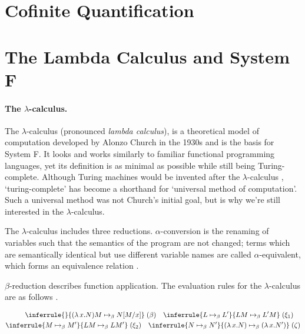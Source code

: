 \documentclass[logo,bsc,singlespacing,parskip,online]{infthesis}
\begin{document}
\section{Cofinite Quantification}



\section{The Lambda Calculus and System F}

\paragraph*{The $\lambda$-calculus.}
The $\lambda$-calculus (pronounced \textit{lambda calculus}), is a theoretical model of computation
developed by Alonzo Church in the 1930s \citep{church_set_1932} and is the basis for System F. It
looks and works similarly to familiar functional programming languages, yet its definition is as
minimal as possible while still being Turing-complete. Although Turing machines would be invented
after the $\lambda$-calculus \citep{turing_computable_1937}, `turing-complete' has become a
shorthand for `universal method of computation'. Such a universal method was not Church's initial
goal, but is why we're still interested in the $\lambda$-calculus.

The $\lambda$-calculus includes three reductions. $\alpha$-conversion is the renaming of variables
such that the semantics of the program are not changed; terms which are semantically identical but
use different variable names are called $\alpha$-equivalent, which forms an equivalence relation
\citep{pierce_types_2002}.

$\beta$-reduction describes function application. The evaluation rules for the $\lambda$-calculus
are as follows \citep{wadler_programming_2022}.

\begin{align}
\label{equation:untyped_beta_rules}
\begin{split}
\inferrule{ }{(\lambda \, x. N)M \mapsto_{\beta} N[M/x]} \; (\beta) \quad
\inferrule{L \mapsto_{\beta} L'}{LM \mapsto_{\beta} L'M} \; (\xi_1) \quad\\
\inferrule{M \mapsto_{\beta} M'}{LM \mapsto_{\beta} LM'} \; (\xi_2) \quad
\inferrule{N \mapsto_{\beta} N'}{(\lambda \, x. N) \mapsto_{\beta} (\lambda \, x. N')} \; (\zeta)
\end{split}
\end{align}
\end{document}
